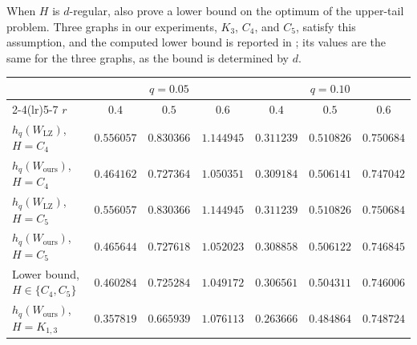 \documentclass[11pt]{article}
\theoremstyle{plain}
\theoremstyle{definition}
\theoremstyle{remark}
\begin{document}
When $H$ is $d$-regular, \citet{lubetzky2015replica} also prove a lower bound on the optimum of the upper-tail problem. Three graphs in our experiments, $K_3$, $C_4$, and $C_5$, satisfy this assumption, and the computed lower bound is reported in ; its values are the same for the three graphs, as the bound is determined by $d$.

\begin{table}[t]
  \centering
  {\small
  \begin{tabular}{lcccccc}
    \toprule
    & \multicolumn{3}{c}{$q=0.05$} & \multicolumn{3}{c}{$q=0.10$} \\
    \cmidrule(lr){2-4}\cmidrule(lr){5-7}
    $r$ & $0.4$ & $0.5$ & $0.6$ & $0.4$ & $0.5$ & $0.6$ \\
    \midrule
    $h_q(W_{\mathrm{LZ}})$, $H=C_4$    & $0.556057$ & $0.830366$ & $1.144945$ & $0.311239$ & $0.510826$ & $0.750684$ \\
    $h_q(W_{\mathrm{ours}})$, $H=C_4$  & $0.464162$ & $0.727364$ & $1.050351$ & $0.309184$ & $0.506141$ & $0.747042$ \\
    \midrule
    $h_q(W_{\mathrm{LZ}})$, $H=C_5$    & $0.556057$ & $0.830366$ & $1.144945$ & $0.311239$ & $0.510826$ & $0.750684$ \\
    $h_q(W_{\mathrm{ours}})$, $H=C_5$  & $0.465644$ & $0.727618$ & $1.052023$ & $0.308858$ & $0.506122$ & $0.746845$ \\
    \midrule
    Lower bound, $H\in\{C_4,C_5\}$    & $0.460284$ & $0.725284$ & $1.049172$ & $0.306561$ & $0.504311$ & $0.746006$ \\
    \midrule
    $h_q(W_{\mathrm{ours}})$, $H=K_{1,3}$    & $0.357819$ & $0.665939$ & $1.076113$ & $0.263666$ & $0.484864$ & $0.748724$ \\
    \bottomrule
  \end{tabular}
  }
\end{table}
\end{document}
